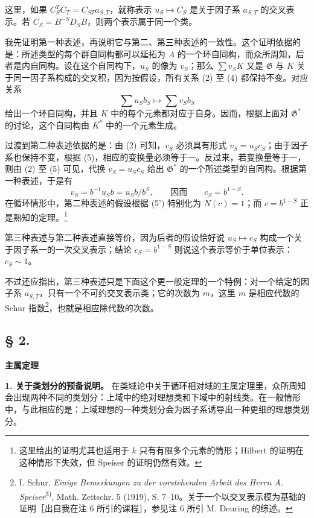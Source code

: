 \documentclass[11pt]{article}
\begin{document}
这里，如果 \(C_S^TC_T=C_{ST}a_{S,T}\)，就称表示 \(u_S\mapsto C_S\) 是关于因子系 \(a_{S,T}\) 的交叉表示。若 \(C_S=B^{-S}D_SB\)，则两个表示属于同一个类。

我先证明第一种表述，再说明它与第二、第三种表述的一致性。这个证明依据的是：所述类型的每个群自同构都可以延拓为 \(A\) 的一个环自同构，而众所周知，后者是内自同构。设在这个自同构下，\(u_S\) 的像为 \(v_S\)；那么 \(\sum v_SK\) 又是 \(\mathfrak G\) 与 \(K\) 关于同一因子系构成的交叉积，因为按假设，所有关系 (2) 至 (4) 都保持不变。对应关系
\[
\sum u_Sb_S\longmapsto\sum v_Sb_S
\]
给出一个环自同构，并且 \(K\) 中的每个元素都对应于自身。因而，根据上面对 \(\mathfrak G^*\) 的讨论，这个自同构由 \(K^*\) 中的一个元素生成。

过渡到第二种表述依据的是：由 (2) 可知，\(v_S\) 必须具有形式 \(v_S=u_Sc_S\)；由于因子系也保持不变，根据 (5)，相应的变换量必须等于一。反过来，若变换量等于一，则由 (2) 至 (5) 可见，代换 \(v_S=u_Sc_S\) 给出 \(\mathfrak G^*\) 的一个所述类型的自同构。根据第一种表述，于是有
\[
v_S=b^{-1}u_Sb=u_Sb/b^S,
\qquad\text{因而}\qquad c_S=b^{1-S}.
\]
在循环情形中，第二种表述的假设根据 (5') 特别化为 \(N(c)=1\)；而 \(c=b^{1-S}\) 正是熟知的定理。\footnote{这里给出的证明尤其也适用于 \(k\) 只有有限多个元素的情形；Hilbert 的证明在这种情形下失效，但 Speiser 的证明仍然有效。}

第三种表述与第二种表述直接等价，因为后者的假设恰好说 \(u_S\mapsto c_S\) 构成一个关于因子系一的一次交叉表示；结论 \(c_S=b^{1-S}\) 则说这个表示等价于单位表示：\(c_S\sim1\)。

不过还应指出，第三种表述只是下面这个更一般定理的一个特例：对一个给定的因子系 \(a_{S,T}\)，只有一个不可约交叉表示类；它的次数为 \(m\)，这里 \(m\) 是相应代数的 Schur 指数\footnote{I. Schur, \emph{Einige Bemerkungen zu der vorstehenden Arbeit des Herrn A. Speiser}\textsuperscript{3)}, Math. Zeitschr. 5 (1919), S. 7--10。关于一个以交叉表示模为基础的证明［出自我在注 6 所引的课程］，参见注 6 所引 M. Deuring 的综述。}，也就是相应除代数的次数。

\subsection*{§ 2.}
\begin{center}
\textbf{主属定理}
\end{center}

\noindent\textbf{1. 关于类划分的预备说明。} 在类域论中关于循环相对域的主属定理里，众所周知会出现两种不同的类划分：上域中的绝对理想类和下域中的射线类。在一般情形中，与此相应的是：上域理想的一种类划分会为因子系诱导出一种更细的理想类划分。
\end{document}
